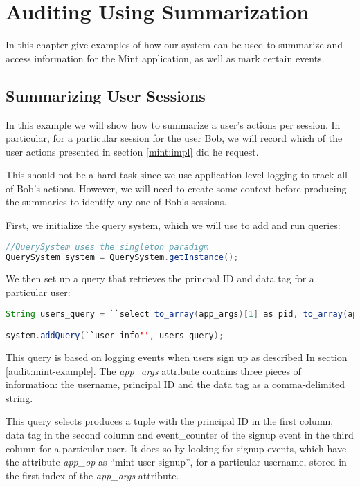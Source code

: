 \chapter{Auditing Using Summarization}

In this chapter give examples of how our system can be used to summarize and access information for the Mint application, as well as mark certain events.

\section{Summarizing User Sessions}
\label{sum:sessions}
In this example we will show how to summarize a user's actions per session. In particular, for a particular session for the user Bob, we will record which of the user actions presented in section \ref{mint:impl} did he request.

This should not be a hard task since we use application-level logging to track all of Bob's actions. However, we will need to create some context before producing the summaries to identify any one of Bob's sessions.

First, we initialize the query system, which we will use to add and run queries:

\begin{lstlisting}[language=Java]
//QuerySystem uses the singleton paradigm
QuerySystem system = QuerySystem.getInstance();
\end{lstlisting}

We then set up a query that retrieves the princpal ID and data tag for a particular user:

\begin{lstlisting}[language=Java]
String users_query = ``select to_array(app_args)[1] as pid, to_array(app_args)[2] as tag, event_counter from events where app_op='mint-user-signup' and to_array(app_args)[0] = ?'';

system.addQuery(``user-info'', users_query);
\end{lstlisting}

\noindent
This query is based on logging events when users sign up as described In section \ref{audit:mint-example}. The \emph{app\_args} attribute contains three pieces of information: the username, principal ID and the data tag as a comma-delimited string.

This query selects produces a tuple with the principal ID in the first column, data tag in the second column and event\_counter of the signup event in the third column for a particular user. It does so by looking for signup events, which have the attribute \emph{app\_op} as ``mint-user-signup'', for a particular username, stored in the first index of the \emph{app\_args} attribute. 

